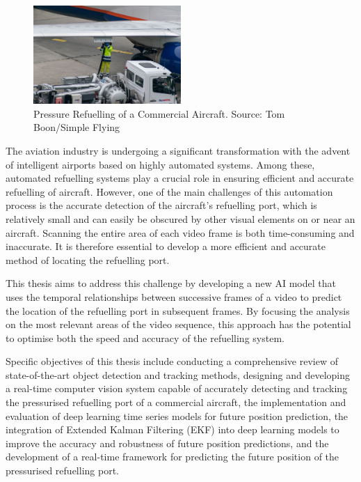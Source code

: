 \documentclass[12pt,oneside]{book} %
\begin{document}
\begin{figure}[H]
    \centering
    \includegraphics[width=0.5\textwidth]{figures/pressure-refuelling.jpeg}
    \caption{Pressure Refuelling of a Commercial Aircraft. Source: Tom Boon/Simple Flying}\label{fig:pressure-refuelling}
\end{figure}

The aviation industry is undergoing a significant transformation with the
advent of intelligent airports based on highly automated systems. Among these,
automated refuelling systems play a crucial role in ensuring efficient and
accurate refuelling of aircraft. However, one of the main challenges of this
automation process is the accurate detection of the aircraft's refuelling port,
which is relatively small and can easily be obscured by other visual elements
on or near an aircraft. Scanning the entire area of each video frame is both
time-consuming and inaccurate. It is therefore essential to develop a more
efficient and accurate method of locating the refuelling port.

This thesis aims to address this challenge by developing a new AI model that
uses the temporal relationships between successive frames of a video to predict
the location of the refuelling port in subsequent frames. By focusing the
analysis on the most relevant areas of the video sequence, this approach has
the potential to optimise both the speed and accuracy of the refuelling system.

Specific objectives of this thesis include conducting a comprehensive review of
state-of-the-art object detection and tracking methods, designing and
developing a real-time computer vision system capable of accurately detecting
and tracking the pressurised refuelling port of a commercial aircraft, the
implementation and evaluation of deep learning time series models for future
position prediction, the integration of Extended Kalman Filtering (EKF) into
deep learning models to improve the accuracy and robustness of future position
predictions, and the development of a real-time framework for predicting the
future position of the pressurised refuelling port.
\end{document}
